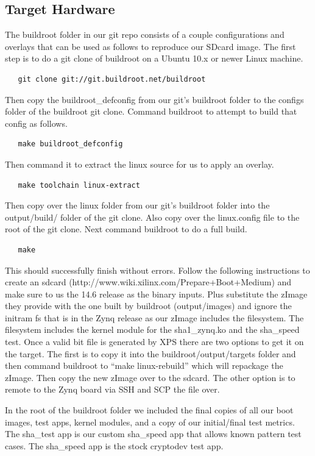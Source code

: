 \documentclass[journal]{IEEEtran}
\begin{document}
\subsection{Target Hardware}
The buildroot folder in our git repo consists of a couple configurations and overlays that can be used as follows to reproduce our SDcard image.  The first step is to do a git clone of buildroot on a Ubuntu 10.x or newer Linux machine.
\begin{verbatim}
   git clone git://git.buildroot.net/buildroot
\end{verbatim}
Then copy the buildroot\_defconfig from our git's buildroot folder to the configs folder of the buildroot git clone.  Command buildroot to attempt to build that config as follows.
\begin{verbatim}
   make buildroot_defconfig
\end{verbatim}
Then command it to extract the linux source for us to apply an overlay.
\begin{verbatim}
   make toolchain linux-extract
\end{verbatim}
Then copy over the linux folder from our git's buildroot folder into the output/build/ folder of the git clone.  Also copy over the linux.config file to the root of the git clone.  Next command buildroot to do a full build.
\begin{verbatim}
   make
\end{verbatim}
This should successfully finish without errors.  Follow the following instructions to create an sdcard (http://www.wiki.xilinx.com/Prepare+Boot+Medium) and make sure to us the 14.6 release as the binary inputs.  Plus substitute the zImage they provide with the one built by buildroot (output/images) and ignore the initram fs that is in the Zynq release as our zImage includes the filesystem.  The filesystem includes the kernel module for the sha1\_zynq.ko and the sha\_speed test.  Once a valid bit file is generated by XPS there are two options to get it on the target.  The first is to copy it into the buildroot/output/targets folder and then command buildroot to “make linux-rebuild” which will repackage the zImage.  Then copy the new zImage over to the sdcard.  The other option is to remote to the Zynq board via SSH and SCP the file over.

In the root of the buildroot folder we included the final copies of all our boot images, test apps, kernel modules, and a copy of our initial/final test metrics.  The sha\_test app is our custom sha\_speed app that allows known pattern test cases.  The sha\_speed app is the stock cryptodev test app.
\end{document}
